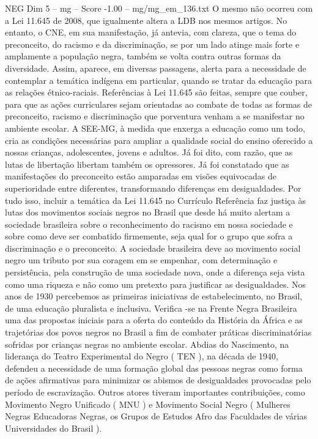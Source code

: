 \begin{textsample}{NEG Dim 5 – mg – Score -1.00 – mg/mg\_em\_136.txt}  \label{ex:f5_neg_105}
O mesmo não ocorreu com a Lei 11.645 de 2008, que igualmente altera a LDB nos mesmos artigos.
No entanto, o CNE, em sua manifestação, já antevia, com clareza, que o tema do preconceito, do racismo e da discriminação, se por um lado atinge mais forte e amplamente a população negra, também se volta contra outras formas da diversidade.
Assim, aparece, em diversas passagens, alerta para a necessidade de contemplar a temática indígena em particular, quando se tratar da educação para as relações étnico-raciais.
Referências à Lei 11.645 são feitas, sempre que couber, para que as ações curriculares sejam orientadas ao combate de todas as formas de preconceito, racismo e discriminação que porventura venham a se manifestar no ambiente escolar.
A SEE-MG, à medida que enxerga a educação como um todo, cria as condições necessárias para ampliar a qualidade social do ensino oferecido a nossas crianças, adolescentes, jovens e adultos.
Já foi dito, com razão, que as lutas de libertação libertam também os opressores.
Já foi constatado que as manifestações do preconceito estão amparadas em visões equivocadas de superioridade entre diferentes, transformando diferenças em desigualdades.
Por tudo isso, incluir a temática da Lei 11.645 no Currículo Referência faz justiça às lutas dos movimentos sociais negros no Brasil que desde há muito alertam a sociedade brasileira sobre o reconhecimento do racismo em nossa sociedade e sobre como deve ser combatido firmemente, seja qual for o grupo que sofra a discriminação e o preconceito.
A sociedade brasileira deve ao movimento social negro um tributo por sua coragem em se empenhar, com determinação e persistência, pela construção de uma sociedade nova, onde a diferença seja vista como uma riqueza e não como um pretexto para justificar as desigualdades.
Nos anos de 1930 percebemos as primeiras iniciativas de estabelecimento, no Brasil, de uma educação pluralista e inclusiva.
Verifica -se na Frente Negra Brasileira uma das propostas iniciais para a oferta do conteúdo da História da África e as trajetórias dos povos negros no Brasil a fim de combater práticas discriminatórias sofridas por crianças negras no ambiente escolar.
Abdias do Nascimento, na liderança do Teatro Experimental do Negro ( TEN ), na década de 1940, defendeu a necessidade de uma formação global das pessoas negras como forma de ações afirmativas para minimizar os abismos de desigualdades provocadas pelo período de escravização.
Outros atores tiveram importantes contribuições, como Movimento Negro Unificado ( MNU ) e Movimento Social Negro ( Mulheres Negras Educadoras Negras, os Grupos de Estudos Afro das Faculdades de várias Universidades do Brasil ).

\end{textsample}
